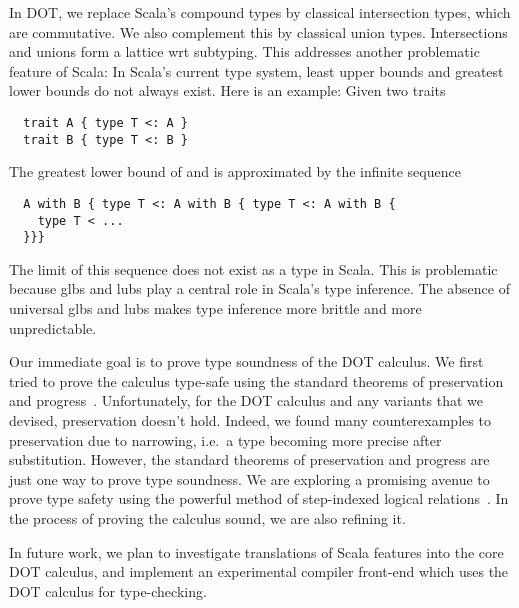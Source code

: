 \documentclass[10pt,journal,a4paper]{IEEEtran}
\begin{document}
In DOT, we replace Scala's compound types by classical intersection
types, which are commutative. We also complement this by classical
union types. Intersections and unions form a lattice wrt
subtyping. This addresses another problematic feature of Scala: In
Scala's current type system, least upper bounds and greatest lower
bounds do not always exist. Here is an example: Given two traits
\begin{lstlisting}
  trait A { type T <: A }
  trait B { type T <: B }
\end{lstlisting}
The greatest lower bound of \code@A@ and \code@B@ is approximated by the
infinite sequence
\begin{lstlisting}
  A with B { type T <: A with B { type T <: A with B {
    type T < ...
  }}}
\end{lstlisting}
The limit of this sequence does not exist as a type in Scala. This is
problematic because glbs and lubs play a central role in Scala's type
inference. The absence of universal glbs and lubs makes type inference
more brittle and more unpredictable.

Our immediate goal is to prove type soundness of the DOT calculus. We
first tried to prove the calculus type-safe using the standard
theorems of preservation and progress~\cite{soundness,
  tapl}. Unfortunately, for the DOT calculus and any variants that we
devised, preservation doesn't hold. Indeed, we found many
counterexamples to preservation due to narrowing, i.e.\ a type becoming more
precise after substitution. However, the standard theorems of
preservation and progress are just one way to prove type soundness. We
are exploring a promising avenue to prove type safety using the
powerful method of step-indexed logical
relations~\cite{ahmed04,ahmed06,step_indexed_obj}. In the process of
proving the calculus sound, we are also refining it.

In future work, we plan to investigate translations of Scala features
into the core DOT calculus, and implement an experimental compiler
front-end which uses the DOT calculus for type-checking.



\end{document}
